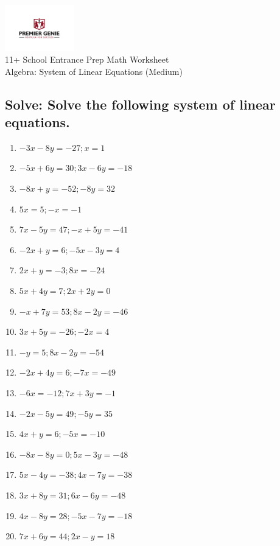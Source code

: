 \documentclass{article}
\begin{document}
\begin{center}
\includegraphics[width=3cm]{PREMGENIEJPG.jpg}\\
{\Large 11+ School Entrance Prep Math Worksheet}\\
{\Medium Algebra: System of Linear Equations (Medium)}\\

\end{center}

\subsection*{Solve: Solve the following system of linear equations.}

\begin{enumerate}
\item $\displaystyle {- 3 x - 8 y}=-27 ; {x}=1 $ \ 
\item $\displaystyle {- 5 x + 6 y}=30 ; {3 x - 6 y}=-18 $ \ 
\item $\displaystyle {- 8 x + y}=-52 ; {- 8 y}=32 $ \ 
\item $\displaystyle {5 x}=5 ; {- x}=-1 $ \ 
\item $\displaystyle {7 x - 5 y}=47 ; {- x + 5 y}=-41 $ \ 
\item $\displaystyle {- 2 x + y}=6 ; {- 5 x - 3 y}=4 $ \ 
\item $\displaystyle {2 x + y}=-3 ; {8 x}=-24 $ \ 
\item $\displaystyle {5 x + 4 y}=7 ; {2 x + 2 y}=0 $ \ 
\item $\displaystyle {- x + 7 y}=53 ; {8 x - 2 y}=-46 $ \ 
\item $\displaystyle {3 x + 5 y}=-26 ; {- 2 x}=4 $ \ 
\item $\displaystyle {- y}=5 ; {8 x - 2 y}=-54 $ \ 
\item $\displaystyle {- 2 x + 4 y}=6 ; {- 7 x}=-49 $ \ 
\item $\displaystyle {- 6 x}=-12 ; {7 x + 3 y}=-1 $ \ 
\item $\displaystyle {- 2 x - 5 y}=49 ; {- 5 y}=35 $ \ 
\item $\displaystyle {4 x + y}=6 ; {- 5 x}=-10 $ \ 
\item $\displaystyle {- 8 x - 8 y}=0 ; {5 x - 3 y}=-48 $ \ 
\item $\displaystyle {5 x - 4 y}=-38 ; {4 x - 7 y}=-38 $ \ 
\item $\displaystyle {3 x + 8 y}=31 ; {6 x - 6 y}=-48 $ \ 
\item $\displaystyle {4 x - 8 y}=28 ; {- 5 x - 7 y}=-18 $ \ 
\item $\displaystyle {7 x + 6 y}=44 ; {2 x - y}=18 $ \ 


\end{enumerate}
\end{document}
